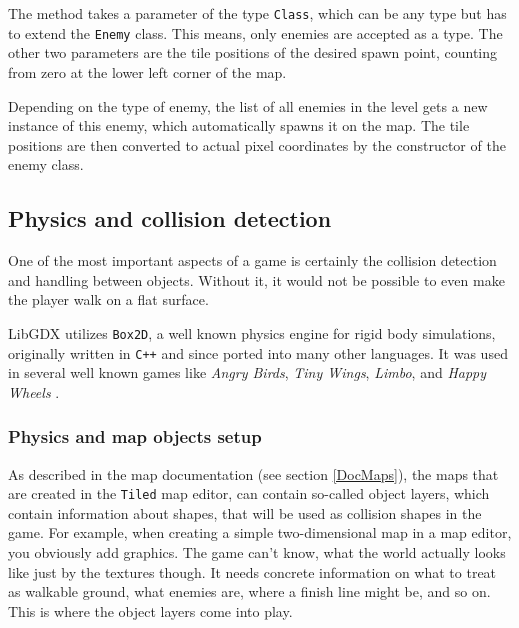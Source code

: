 \documentclass[12p]{article}
\begin{document}
The method takes a parameter of the type \texttt{Class}, which can be any type but has to extend the \texttt{Enemy} class. This means, only enemies are accepted as a type. The other two parameters are the tile positions of the desired spawn point, counting from zero at the lower left corner of the map.

Depending on the type of enemy, the list of all enemies in the level gets a new instance of this enemy, which automatically spawns it on the map. The tile positions are then converted to actual pixel coordinates by the constructor of the enemy class.

 
\newpage
\subsection{Physics and collision detection} \label{DocCollisions}

One of the most important aspects of a game is certainly the collision detection and handling between objects. Without it, it would not be possible to even make the player walk on a flat surface.

LibGDX utilizes \texttt{Box2D}, a well known physics engine for rigid body simulations, originally written in \texttt{C++} and since ported into many other languages. It was used in several well known games like \emph{Angry Birds}, \emph{Tiny Wings}, \emph{Limbo}, and \emph{Happy Wheels} \cite{box2DGithub}\cite{box2DWikipedia}.

\subsubsection{Physics and map objects setup} \label{DocPhysicsAndBodySetup}

As described in the map documentation (see section \ref{DocMaps}), the maps that are created in the \texttt{Tiled} map editor, can contain so-called object layers, which contain information about shapes, that will be used as collision shapes in the game. For example, when creating a simple two-dimensional map in a map editor, you obviously add graphics. The game can't know, what the world actually looks like just by the textures though. It needs concrete information on what to treat as walkable ground, what enemies are, where a finish line might be, and so on. This is where the object layers come into play.
\end{document}
